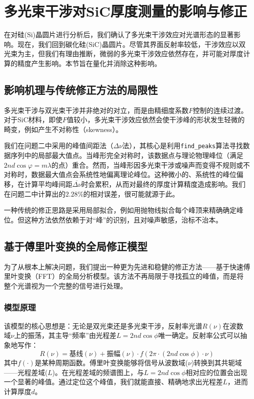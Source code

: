 \documentclass[withoutpreface,bwprint]{cumcmthesis} %
\begin{document}

\section{多光束干涉对SiC厚度测量的影响与修正}

在对硅(Si)晶圆片进行分析后，我们确认了多光束干涉效应对光谱形态的显著影响。现在，我们回到碳化硅(SiC)晶圆片。尽管其界面反射率较低，干涉效应以双光束为主，但我们有理由推断，微弱的多光束干涉效应依然存在，并可能对厚度计算的精度产生影响。本节旨在量化并消除这种影响。

\subsection{影响机理与传统修正方法的局限性}

多光束干涉与双光束干涉并非绝对的对立，而是由精细度系数$F$控制的连续过渡。对于SiC材料，即使$F$值较小，多光束干涉效应依然会使干涉峰的形状发生轻微的畸变，例如产生不对称性（skewness）。

我们在问题二中采用的峰值间距法（$\Delta\nu$法），其核心是利用\texttt{find\_peaks}算法寻找数据序列中的局部最大值点。当峰形完全对称时，该数据点与理论物理峰位（满足$2nd\cos\varphi=m\lambda$的点）重合。然而，当峰形因多光束干涉或噪声而变得不规则或不对称时，数据最大值点会系统性地偏离理论峰位。这种微小的、系统性的峰位偏移，在计算平均峰间距$\overline{\Delta\nu}$时会累积，从而对最终的厚度计算精度造成影响。我们在问题二中计算出的$2.28\%$的相对误差，很可能就源于此。

一种传统的修正思路是采用局部拟合，例如用抛物线拟合每个峰顶来精确确定峰位。但这种方法依然依赖于对“峰”的识别，且对噪声敏感，治标不治本。

\subsection{基于傅里叶变换的全局修正模型}

为了从根本上解决问题，我们提出一种更为先进和稳健的修正方法——基于快速傅里叶变换（FFT）的全局分析模型。该方法不再局限于寻找孤立的峰值，而是将整个光谱视为一个完整的信号进行处理。

\subsubsection{模型原理}
该模型的核心思想是：无论是双光束还是多光束干涉，反射率光谱$R(\nu)$在波数域$\nu$上的振荡，其主导“频率”由光程差$L = 2nd\cos\phi$唯一确定。反射率公式可以抽象地写作：
$$
    R(\nu) = \text{基线}(\nu) + \text{振幅}(\nu) \cdot f(2\pi \cdot (2nd\cos\phi) \cdot \nu)
$$
其中$f(\cdot)$是某种周期函数。傅里叶变换能够将信号从波数域($\nu$)转换到其共轭域——光程差域($L$)。在光程差域的频谱图上，与$L=2nd\cos\phi$相对应的位置会出现一个显著的峰值。通过定位这个峰值，我们就能直接、精确地求出光程差$L$，进而计算厚度$d$。
\end{document}
